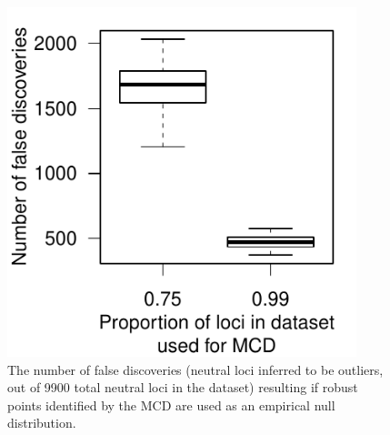 \documentclass[12pt, oneside]{amsart}
\begin{document}
\newpage
\begin{figure}[h]
\begin{center}
\includegraphics[width=4in]{../figures_man2/S3-LandsharcFalsePositivesMCD.pdf}
\end{center}
\caption[]{The number of false discoveries (neutral loci inferred to be outliers, out of 9900 total neutral loci in the dataset) resulting if robust points identified by the MCD are used as an empirical null distribution.} 
 \label{fig:???}
\end{figure}
\end{document}
